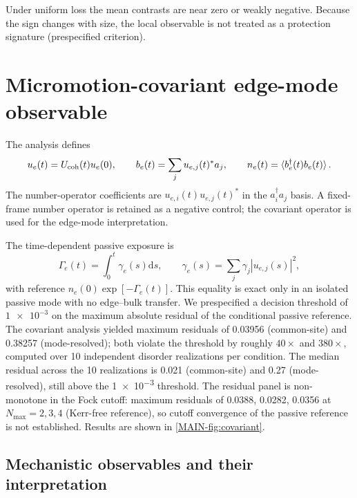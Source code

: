 \documentclass[aps,pra,preprint,superscriptaddress,amsmath,amssymb]{revtex4-2}
\newcommand{\dd}{\mathrm{d}}
\begin{document}
Under uniform loss the mean contrasts are near zero or weakly negative. Because the sign changes with size, the local observable is not treated as a protection signature (prespecified criterion).

\section{Micromotion-covariant edge-mode observable}
\label{sec:covariantmethod}

The analysis defines
\begin{equation}\label{eq:covariant}
u_e(t)=U_{\rm coh}(t)u_e(0),\qquad
b_e(t)=\sum_j u_{e,j}(t)^*a_j,
\qquad n_e(t)=\braket{b_e^\dagger(t)b_e(t)}.
\end{equation}
The number-operator coefficients are $u_{e,i}(t)u_{e,j}(t)^*$ in the $a_i^\dagger a_j$ basis. A fixed-frame number operator is retained as a negative control; the covariant operator is used for the edge-mode interpretation.

The time-dependent passive exposure is
\begin{equation}\label{eq:exposure}
\Gamma_e(t)=\int_0^t\gamma_e(s)\dd s,
\qquad \gamma_e(s)=\sum_j\gamma_j|u_{e,j}(s)|^2,
\end{equation}
with reference $n_e(0)\exp[-\Gamma_e(t)]$. This equality is exact only in an isolated passive mode with no edge--bulk transfer. We prespecified a decision threshold of $\num{1e-3}$ on the maximum absolute residual of the conditional passive reference. The covariant analysis yielded maximum residuals of \num{0.03956} (common-site) and \num{0.38257} (mode-resolved); both violate the threshold by roughly $\num{40}\times$ and $\num{380}\times$, computed over \num{10} independent disorder realizations per condition. The median residual across the \num{10} realizations is \num{0.021} (common-site) and \num{0.27} (mode-resolved), still above the \num{1e-3} threshold. The residual panel is non-monotone in the Fock cutoff: maximum residuals of \num{0.0388}, \num{0.0282}, \num{0.0356} at $N_{\max}=\num{2},\num{3},\num{4}$ (Kerr-free reference), so cutoff convergence of the passive reference is not established. Results are shown in \cref{MAIN-fig:covariant}.

\subsection{Mechanistic observables and their interpretation}
\label{sec:mechanisticobservables}
\end{document}
